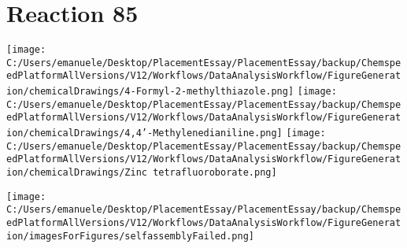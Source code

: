 \documentclass{article}%
\begin{document}
\section*{Reaction 85}%
%
\begin{scheme}[H]%
\begin{minipage}{0.5\textwidth}%
\texttt{[image: C:/Users/emanuele/Desktop/PlacementEssay/PlacementEssay/backup/ChemspeedPlatformAllVersions/V12/Workflows/DataAnalysisWorkflow/FigureGeneration/chemicalDrawings/4-Formyl-2-methylthiazole.png]}%
\texttt{[image: C:/Users/emanuele/Desktop/PlacementEssay/PlacementEssay/backup/ChemspeedPlatformAllVersions/V12/Workflows/DataAnalysisWorkflow/FigureGeneration/chemicalDrawings/4,4'-Methylenedianiline.png]}%
\texttt{[image: C:/Users/emanuele/Desktop/PlacementEssay/PlacementEssay/backup/ChemspeedPlatformAllVersions/V12/Workflows/DataAnalysisWorkflow/FigureGeneration/chemicalDrawings/Zinc tetrafluoroborate.png]}%
\end{minipage}%
\begin{minipage}{0.5\textwidth}%
\begin{center}%
\texttt{[image: C:/Users/emanuele/Desktop/PlacementEssay/PlacementEssay/backup/ChemspeedPlatformAllVersions/V12/Workflows/DataAnalysisWorkflow/FigureGeneration/imagesForFigures/selfassemblyFailed.png]}%
\end{center}%
\end{minipage}%
\caption{Self-assembly of components 1, 17, with Zinc(II) in a 3.0:1.5:1.0 molar ratio in CH$_3$CN at 60\textdegree C for 40h. These are the reagents (starting materials) for reaction 85.}%
\end{scheme}%
\end{document}
